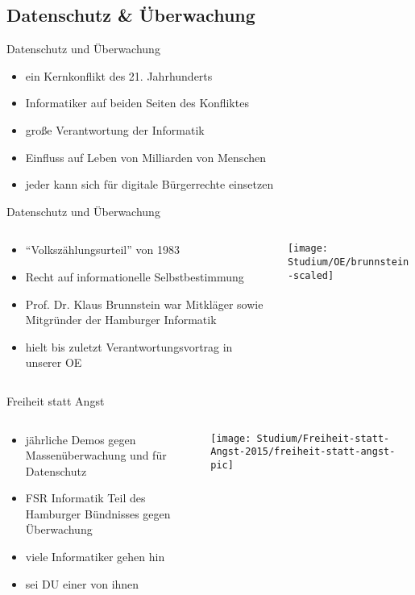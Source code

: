 \documentclass{beamer}
\begin{document}
\subsection{Datenschutz \& Überwachung}
\begin{frame}{Datenschutz und Überwachung}
  \begin{itemize}
    \item ein Kernkonflikt des 21. Jahrhunderts
    \item Informatiker auf beiden Seiten des Konfliktes
    \item große Verantwortung der Informatik
    \item Einfluss auf Leben von Milliarden von Menschen
    \item jeder kann sich für digitale Bürgerrechte einsetzen
  \end{itemize}
\end{frame}
\begin{frame}{Datenschutz und Überwachung}
  \begin{columns}[T]
    \begin{column}{0.48\textwidth}
      \begin{itemize}
        \item "`Volkszählungsurteil"' von 1983
        \item Recht auf informationelle Selbstbestimmung
        \item Prof. Dr. Klaus Brunnstein war Mitkläger sowie Mitgründer der Hamburger Informatik
        \item hielt bis zuletzt Verantwortungsvortrag in unserer OE
      \end{itemize}
    \end{column}
    \hfill
    \begin{column}{0.5\textwidth}
      \centering
      \texttt{[image: Studium/OE/brunnstein-scaled]}
    \end{column}
  \end{columns}
\end{frame}
\begin{frame}{Freiheit statt Angst}
  \begin{columns}[T]
    \begin{column}{.48\textwidth}
      \begin{itemize}
        \item jährliche Demos gegen Massenüberwachung und für Datenschutz
        \item FSR Informatik Teil des Hamburger Bündnisses gegen Überwachung
        \item viele Informatiker gehen hin
        \item sei DU einer von ihnen
      \end{itemize}
    \end{column}
    \hfill
    \begin{column}{0.5\textwidth}
      \centering
      \texttt{[image: Studium/Freiheit-statt-Angst-2015/freiheit-statt-angst-pic]}
    \end{column}
  \end{columns}
\end{frame}
\end{document}
